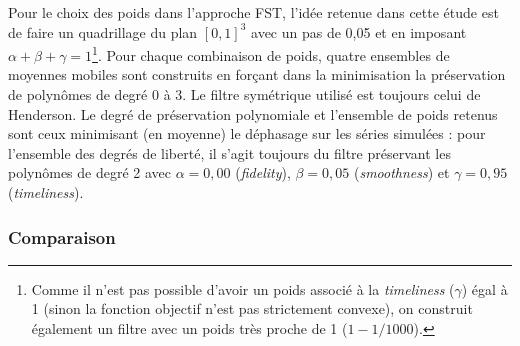 \documentclass[
  12pt,
  a4paper,french]{article}
\newcommand\1{\mathds{1}}
\begin{document}
Pour le choix des poids dans l'approche FST, l'idée retenue dans cette étude est de faire un quadrillage du plan \([0,1]^3\) avec un pas de 0,05 et en imposant \(\alpha + \beta + \gamma = 1\)\footnote{
  Comme il n'est pas possible d'avoir un poids associé à la \emph{timeliness} (\(\gamma\)) égal à 1 (sinon la fonction objectif n'est pas strictement convexe), on construit également un filtre avec un poids très proche de 1 (\(1-1/1000\)).}.
Pour chaque combinaison de poids, quatre ensembles de moyennes mobiles sont construits en forçant dans la minimisation la préservation de polynômes de degré 0 à 3.
Le filtre symétrique utilisé est toujours celui de Henderson.
Le degré de préservation polynomiale et l'ensemble de poids retenus sont ceux minimisant (en moyenne) le déphasage sur les séries simulées : pour l'ensemble des degrés de liberté, il s'agit toujours du filtre préservant les polynômes de degré 2 avec \(\alpha = 0,00\) (\emph{fidelity}), \(\beta =0,05\) (\emph{smoothness}) et \(\gamma = 0,95\) (\emph{timeliness}).

\hypertarget{comparaison}{%
\subsubsection{Comparaison}\label{comparaison}}
\end{document}
